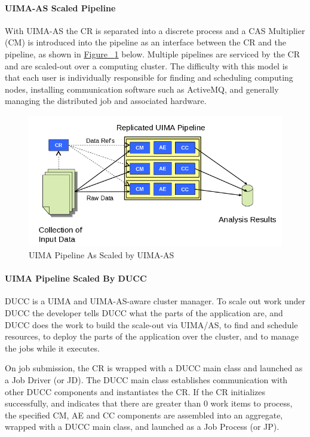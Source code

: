    \paragraph{UIMA-AS  Scaled Pipeline}
    With UIMA-AS the CR is separated into a discrete process and a CAS Multiplier (CM) is introduced 
    into the pipeline as an interface between the CR and the pipeline, as shown in
    \hyperref[fig:UIMA-AS-pipeline]{Figure ~\ref{fig:UIMA-AS-pipeline}} below.
    Multiple pipelines are serviced by the 
    CR and are scaled-out over a computing cluster.  The difficulty with this model is that each
    user is individually responsible for finding and scheduling computing nodes, installing
    communication software such as ActiveMQ, and generally managing the distributed job and
    associated hardware.

    \begin{figure}[H]
      \centering
      \includegraphics[width=5.5in]{images/uima-as-pipeline.png}
      \caption{UIMA Pipeline As Scaled by UIMA-AS}
      \label{fig:UIMA-AS-pipeline}
    \end{figure}

    \paragraph{UIMA Pipeline Scaled By DUCC}
    DUCC is a UIMA and  UIMA-AS-aware cluster manager.  To scale out work under DUCC the developer
    tells DUCC what the parts of the application are, and DUCC does the work to build the
    scale-out via UIMA/AS, to find and schedule resources, to deploy the parts of the application
    over the cluster, and to manage the jobs while it executes.

    On job submission, the CR is wrapped with a DUCC main class and launched as a Job Driver (or JD).
    The DUCC main class establishes communication with other DUCC components and instantiates the CR.
    If the CR initializes successfully, and indicates that there are greater than 0 work items to process,
    the specified CM, AE and CC components are assembled into an aggregate, wrapped with a DUCC main
    class, and launched as a Job Process (or JP).

